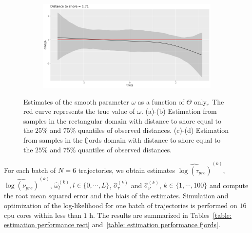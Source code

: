 \documentclass[11pt]{article}
\newcommand {\1}{\mathbb{1}}
\theoremstyle{definition}
\theoremstyle{remark}
\theoremstyle{remark}
\begin{document}
\begin{figure}[H]
\begin{subfigure}{0.48\textwidth}
		\caption{}
	\end{subfigure}
	\begin{subfigure}{0.48\textwidth}
		\centering
		\includegraphics[scale=0.3]{images/simulation study/fe_crcvm_fjords_hf_ne1_omega_theta_q2_ExpShore .png}
		\caption{}
	\end{subfigure}
	\caption{Estimates of the smooth parameter $\omega$ as a function of $\Theta$ only,. The red curve represents the true value of $\omega$. (a)-(b) Estimation from samples in the rectangular domain with distance to shore equal to the $25\%$ and $75\%$ quantiles of observed distances. (c)-(d) Estimation from samples in the fjords domain with distance to shore equal to the $25\%$ and $75\%$ quantiles of observed distances. }
	\label{fig: marginal_estimates_CRCVM}
\end{figure}


For each batch of $N=6$ trajectories, we obtain estimates $\widehat{\log(\tau_{pre})}^{(k)}$, $\widehat{\log(\nu_{pre})}^{(k)}$, $\hat{\omega}_l^{(k)}, l \in \{0,\cdots, L\}$, $\hat{\sigma}_{\tau}^{(k)}$ and $\hat{\sigma}_{\nu}^{(k)}$, $k \in \{1,\cdots,100\}$ and compute the root mean squared error and the biais of the estimates. Simulation and optimization of the log-likelihood for one batch of trajectories is performed on $16$ cpu cores within less than $1$ h. The results are summarized in Tables~\ref{table: estimation performance rect} and~\ref{table: estimation performance fjords}. 
\end{document}
